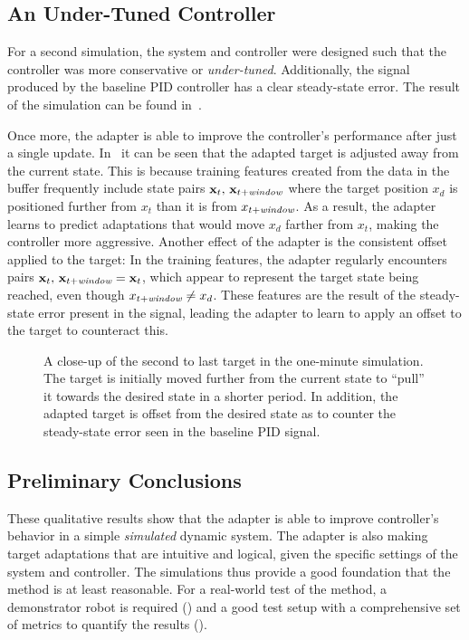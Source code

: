\subsection{An Under-Tuned Controller}\label{subsec:toy-damped}
For a second simulation, the system and controller were designed such that the controller was more conservative or \emph{under-tuned}.
Additionally, the signal produced by the baseline PID controller has a clear steady-state error.
The result of the simulation can be found in~.

Once more, the adapter is able to improve the controller's performance after just a single update.
In~ it can be seen that the adapted target is adjusted away from the current state.
This is because training features created from the data in the buffer frequently include state pairs $\mathbf{x}_t,\, \mathbf{x}_{t+\emph{window}}$ where the target position $x_d$ is positioned further from $x_t$ than it is from $x_{t+\emph{window}}$.
As a result, the adapter learns to predict adaptations that would move $x_d$ farther from $x_t$, making the controller more aggressive.
Another effect of the adapter is the consistent offset applied to the target:
In the training features, the adapter regularly encounters pairs $\mathbf{x}_t, \, \mathbf{x}_{t+\emph{window}} = \mathbf{x}_t$, which appear to represent the target state being reached, even though $x_{t+\emph{window}}\neq x_d$.
These features are the result of the steady-state error present in the signal, leading the adapter to learn to apply an offset to the target to counteract this.

\begin{figure}
    \centering
    
    \vspace*{-2em}
    \caption{A close-up of the second to last target in the one-minute simulation. The target is initially moved further from the current state to ``pull'' it towards the desired state in a shorter period. In addition, the adapted target is offset from the desired state as to counter the steady-state error seen in the baseline PID signal.}
    \label{fig:toy-plot-damped-closeup}
\end{figure}

\subsection{Preliminary Conclusions}\label{subsec:prelminary-conclusion}
These qualitative results show that the adapter is able to improve controller's behavior in a simple \emph{simulated} dynamic system.
The adapter is also making target adaptations that are intuitive and logical, given the specific settings of the system and controller.
The simulations thus provide a good foundation that the method is at least reasonable.
For a real-world test of the method, a demonstrator robot is required () and a good test setup with a comprehensive set of metrics to quantify the results ().
